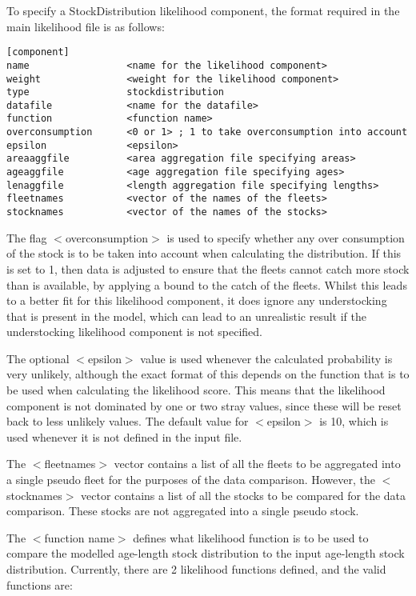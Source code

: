 \documentclass [a4paper, 10pt]{book}
\begin{document}
\bigskip
To specify a StockDistribution likelihood component, the format required in the main likelihood file is as follows:

{\small\begin{verbatim}
[component]
name                 <name for the likelihood component>
weight               <weight for the likelihood component>
type                 stockdistribution
datafile             <name for the datafile>
function             <function name>
overconsumption      <0 or 1> ; 1 to take overconsumption into account
epsilon              <epsilon>
areaaggfile          <area aggregation file specifying areas>
ageaggfile           <age aggregation file specifying ages>
lenaggfile           <length aggregation file specifying lengths>
fleetnames           <vector of the names of the fleets>
stocknames           <vector of the names of the stocks>
\end{verbatim}}

The flag $<$overconsumption$>$ is used to specify whether any over consumption of the stock is to be taken into account when calculating the distribution.  If this is set to 1, then data is adjusted to ensure that the fleets cannot catch more stock than is available, by applying a bound to the catch of the fleets.  Whilst this leads to a better fit for this likelihood component, it does ignore any understocking that is present in the model, which can lead to an unrealistic result if the understocking likelihood component is not specified.

\bigskip
The optional $<$epsilon$>$ value is used whenever the calculated probability is very unlikely, although the exact format of this depends on the function that is to be used when calculating the likelihood score.  This means that the likelihood component is not dominated by one or two stray values, since these will be reset back to less unlikely values.  The default value for $<$epsilon$>$ is 10, which is used whenever it is not defined in the input file.

\bigskip
The $<$fleetnames$>$ vector contains a list of all the fleets to be aggregated into a single pseudo fleet for the purposes of the data comparison.  However, the $<$stocknames$>$ vector contains a list of all the stocks to be compared for the data comparison.  These stocks are not aggregated into a single pseudo stock.

\bigskip
The $<$function name$>$ defines what likelihood function is to be used to compare the modelled age-length stock distribution to the input age-length stock distribution.  Currently, there are 2 likelihood functions defined, and the  valid functions are:
\end{document}
